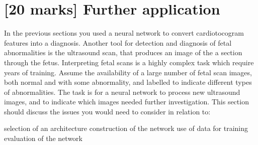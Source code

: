 \documentclass[11pt,a4paper]{article}
\begin{document}
\section{[20 marks] Further application}
\label{sec:further}
In the previous sections you used a neural network to convert cardiotocogram features into a diagnosis. Another tool for detection and diagnosis of fetal abnormalities is the ultrasound scan, that produces an image of the a section through the fetus. Interpreting fetal scans is a highly complex task which require years of training. Assume the availability of a large number of fetal scan images, both normal and with some abnormality, and labelled to indicate different types of abnormalities. The task is for a neural network to process new ultrasound images, and to indicate which images needed further investigation. This section should discuss the issues you would need to consider in relation to:
\begin{outline}
  \1 selection of an architecture
  \1 construction of the network
  \1 use of data for training
  \1 evaluation of the network
\end{outline}

\end{document}
